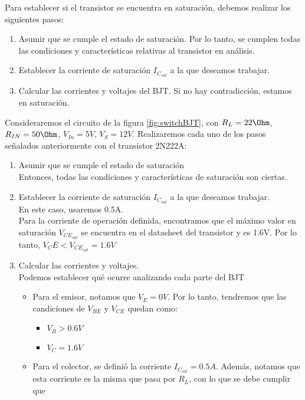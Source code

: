 \documentclass[11pt,fancy,lang=es]{elegantbook}
\begin{document}
Para establecer si el transistor se encuentra en saturación, debemos realizar los siguientes pasos:

\begin{enumerate}
    \item Asumir que se cumple el estado de saturación. Por lo tanto, se cumplen todas las condiciones y características relativas al transistor en análisis.
    \item Establecer la corriente de saturación $I_{C_{sat}}$ a la que deseamos trabajar.
    \item Calcular las corrientes y voltajes del BJT. Si no hay contradicción, estamos en saturación.
\end{enumerate}

\begin{example}


    Consideraremos el circuito de la figura \ref{fig:switchBJT}, con $R_L=22\Ohm$,$R_{IN}=50\Ohm$, $V_{In}=5V$, $V_S=12V$. Realizaremos cada uno de los pasos señalados anteriormente con el transistor 2N222A:

    \begin{enumerate}
        \item Asumir que se cumple el estado de saturación\\
              Entonces, todas las condiciones y características de saturación son ciertas.

        \item Establecer la corriente de saturación $I_{C_{sat}}$ a la que deseamos trabajar. \\
              En este caso, usaremos 0.5A.\\

              Para la corriente de operación definida, encontramos que el máximo valor en saturación $V_{CE_{sat}}$ se encuentra en el datasheet del transistor y es 1.6V.
              Por lo tanto, $V_CE<V_{CE_{sat}}=1.6V$

        \item Calcular las corrientes y voltajes.\\
              Podemos establecer qué ocurre analizando cada parte del BJT
              \begin{itemize}
                  \item Para el emisor, notamos que $V_E=0V$. Por lo tanto, tendremos que las candiciones de $V_{BE}$ y $V_{CE}$ quedan como:
                        \begin{itemize}
                            \item $V_B>0.6V$
                            \item $V_C=1.6V$
                        \end{itemize}
                  \item Para el colector, se definió la corriente $I_{C_{sat}}=0.5A$. Además, notamos que esta corriente es la misma que pasa por $R_L$, con lo que se debe cumplir que


\end{itemize}
\end{enumerate}
\end{example}
\end{document}
